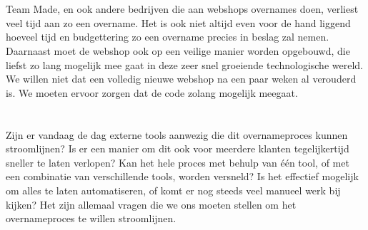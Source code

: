 \section{}%
\label{sec:probleemstelling}


Team Made, en ook andere bedrijven die aan webshops overnames doen, verliest veel tijd aan zo een overname. Het is ook niet altijd even voor de hand liggend hoeveel tijd en budgettering zo een overname precies in beslag zal nemen. Daarnaast moet de webshop ook op een veilige manier worden opgebouwd, die liefst zo lang mogelijk mee gaat in deze zeer snel groeiende technologische wereld. We willen niet dat een volledig nieuwe webshop na een paar weken al verouderd is. We moeten ervoor zorgen dat de code zolang mogelijk meegaat.

\section{}%
\label{sec:onderzoeksvraag}


Zijn er vandaag de dag externe tools aanwezig die dit overnameproces kunnen stroomlijnen? Is er een manier om dit ook voor meerdere klanten tegelijkertijd sneller te laten verlopen? Kan het hele proces met behulp van één tool, of met een combinatie van verschillende tools, worden versneld? Is het effectief mogelijk om alles te laten automatiseren, of komt er nog steeds veel manueel werk bij kijken? Het zijn allemaal vragen die we ons moeten stellen om het overnameproces te willen stroomlijnen.

